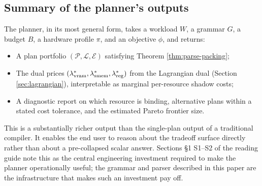 \subsection{Summary of the planner's outputs}

The planner, in its most general form, takes a
workload $W$, a grammar $G$, a budget $B$, a
hardware profile $\pi$, and an objective $\phi$,
and returns:

\begin{itemize}[nosep]
  \item A plan portfolio
    $(\mathcal{P}, \mathcal{L}, \mathcal{E})$
    satisfying Theorem \ref{thm:parse-packing};
  \item The dual prices $(\lambda_{\operatorname{vram}}^*,
    \lambda_{\operatorname{smem}}^*, \lambda_{\operatorname{reg}}^*)$ from
    the Lagrangian dual
    (Section \ref{sec:lagrangian}), interpretable
    as marginal per-resource shadow costs;
  \item A diagnostic report on which resource
    is binding, alternative plans within a stated
    cost tolerance, and the estimated Pareto
    frontier size.
\end{itemize}

This is a substantially richer output than the
single-plan output of a traditional compiler. It
enables the end user to reason about the tradeoff
surface directly rather than about a pre-collapsed
scalar answer. Sections \S1 S1--S2 of the reading
guide note this as the central engineering
investment required to make the planner
operationally useful; the grammar and parser
described in this paper are the infrastructure
that makes such an investment pay off.
